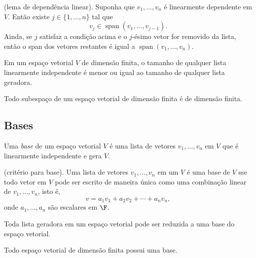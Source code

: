 \documentclass{article}
\DeclareMathOperator{\spn}{span}
\begin{document}
\begin{lem} (lema de dependência linear).
    Suponha que \(v_1, \ldots, v_n\) é linearmente dependente em \(V\). Então existe \(j \in \{1, \ldots, n\}\) tal que
    \begin{equation}
        v_j \in \spn(v_1, \ldots, v_{j-1}).
    \end{equation}
    \noindent Ainda, se \(j\) satisfaz a condição acima e o \(j\)-ésimo vetor for removido da lista, então o span dos vetores restantes é igual a \(\spn(v_1, \ldots, v_n)\).
\end{lem}

\begin{prop}
    Em um espaço vetorial \(V\) de dimensão finita, o tamanho de qualquer lista linearmente independente é menor ou igual ao tamanho de qualquer lista geradora.
\end{prop}

\begin{prop}
    Todo subespaço de um espaço vetorial de dimensão finita é de dimensão finita.
\end{prop}

\subsection{Bases}
\begin{defn}
    Uma \emph{base} de um espaço vetorial \(V\) é uma lista de vetores \(v_1, \ldots, v_n\) em \(V\) que é linearmente independente e gera \(V\).
\end{defn}

\begin{prop} (critério para base).
    Uma lista de vetores \(v_1, \ldots, v_n\) em um \(V\) é uma base de \(V\) sse todo vetor em \(V\) pode ser escrito de maneira única como uma combinação linear de \(v_1, \ldots, v_n\), isto é,
    \begin{equation}
        v = a_1 v_1 + a_2 v_2 + \cdots + a_n v_n,
    \end{equation}
    \noindent onde \(a_1, \ldots, a_n\) são escalares em \(\F\).
\end{prop}

\begin{prop}
    Toda lista geradora em um espaço vetorial pode ser reduzida a uma base do espaço vetorial.
\end{prop}

\begin{cor}
    Todo espaço vetorial de dimensão finita possui uma base.
\end{cor}
\end{document}
